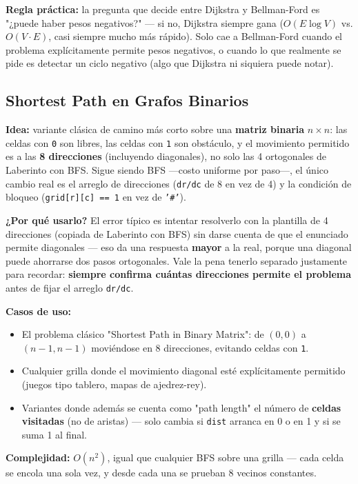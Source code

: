 \documentclass[10pt,a4paper,twocolumn]{article}
\begin{document}
\textbf{Regla práctica:} la pregunta que decide entre Dijkstra y
Bellman-Ford es "¿puede haber pesos negativos?" — si no, Dijkstra
siempre gana ($O(E\log V)$ vs. $O(V \cdot E)$, casi siempre mucho más
rápido). Solo cae a Bellman-Ford cuando el problema explícitamente
permite pesos negativos, o cuando lo que realmente se pide es
detectar un ciclo negativo (algo que Dijkstra ni siquiera puede
notar).

\subsection{Shortest Path en Grafos Binarios}

\textbf{Idea:} variante clásica de camino más corto sobre una
\textbf{matriz binaria} $n \times n$: las celdas con \texttt{0} son
libres, las celdas con \texttt{1} son obstáculo, y el movimiento
permitido es a las \textbf{8 direcciones} (incluyendo diagonales), no
solo las 4 ortogonales de Laberinto con BFS. Sigue siendo BFS
—costo uniforme por paso—, el único cambio real es el arreglo de
direcciones (\texttt{dr/dc} de 8 en vez de 4) y la condición de
bloqueo (\texttt{grid[r][c] == 1} en vez de \texttt{'\#'}).

\textbf{¿Por qué usarlo?} El error típico es intentar resolverlo con
la plantilla de 4 direcciones (copiada de Laberinto con BFS) sin
darse cuenta de que el enunciado permite diagonales — eso da una
respuesta \textbf{mayor} a la real, porque una diagonal puede
ahorrarse dos pasos ortogonales. Vale la pena tenerlo separado
justamente para recordar: \textbf{siempre confirma cuántas
	direcciones permite el problema} antes de fijar el arreglo
\texttt{dr/dc}.

\textbf{Casos de uso:}

\begin{itemize}
	\item El problema clásico "Shortest Path in Binary Matrix":
	de $(0,0)$ a $(n-1,n-1)$ moviéndose en 8 direcciones, evitando
	celdas con \texttt{1}.
	\item Cualquier grilla donde el movimiento diagonal esté
	explícitamente permitido (juegos tipo tablero, mapas de
	ajedrez-rey).
	\item Variantes donde además se cuenta como "path length" el
	número de \textbf{celdas visitadas} (no de aristas) — solo
	cambia si \texttt{dist} arranca en 0 o en 1 y si se suma 1 al
	final.
\end{itemize}

\textbf{Complejidad:} $O(n^2)$, igual que cualquier BFS sobre una
grilla — cada celda se encola una sola vez, y desde cada una se
prueban 8 vecinos constantes.
\end{document}
